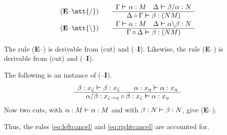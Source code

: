 \begin{equation}
\begin{array}{ll}
\mbox{\rm (\textbf{E}--{\mtt{\tf}})} &
\quad\begin{array}{c}
        \Gamma \bvdash \alpha : M
    \quad \Delta \bvdash \beta/\alpha : N \\\hline
            \Delta \circ \Gamma \bvdash \beta : (NM)
              \end{array} \\
\mbox{\rm (\textbf{E}--{\mtt{\tb}})} &
\quad\begin{array}{c}
        \Gamma \bvdash \alpha : M \quad
    \Delta \bvdash \alpha\backslash \beta : N \\\hline
            \Gamma \circ \Delta \bvdash \beta : (NM)
                \end{array}
\end{array}
\end{equation}
\begin{lem}
\label{lem:e-der}
The rule \mbox{\rm (\textbf{E}--{\mtt{\tf}})} is derivable from 
(cut) and \mbox{\rm ({\mtt{\tf}}--\textbf{I})}. Likewise, the rule 
\mbox{\rm (\textbf{E}--{\mtt{\tf}})} is derivable from 
(cut) and \mbox{\rm ({\mtt{\tf}}--\textbf{I})}. 
\end{lem}
\proofbeg
The following is an instance of \mbox{\rm ({\mtt{\tf}}--\textbf{I})}. 
\begin{equation}
\begin{array}{c}
\beta : x_{\zeta} \boldsymbol{\vdash} \beta : x_{\zeta} \qquad
	\alpha : x_{\eta} \boldsymbol{\vdash} \alpha :x_{\eta} 
\\\hline
\alpha/\beta : x_{\zeta\rightarrow\eta} \circ \beta : x_{\zeta} 
	\boldsymbol{\vdash} \alpha : x_{\eta} 
\end{array}
\end{equation}
Now two cuts, with $\alpha : M \boldsymbol{\vdash} \alpha : M$ and with 
$\beta : N \boldsymbol{\vdash} \beta :N$, give \mbox{\rm (\textbf{E}--{\mtt{\tf}})}.
\proofend

Thus, the rules \eqref{eq:leftcancel} and \eqref{eq:rightcancel} 
are accounted for.

